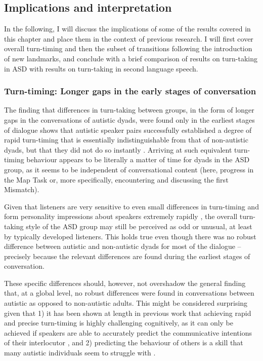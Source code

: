 \subsection{Implications and interpretation}\label{turntaking_conclusion_discussion}

In the following, I will discuss the implications of some of the results covered in this chapter and place them in the context of previous research. I will first cover overall turn-timing and then the subset of transitions following the introduction of new landmarks, and conclude with a brief comparison of results on turn-taking in ASD with results on turn-taking in second language speech.


\subsubsection{Turn-timing: Longer gaps in the early stages of conversation}\label{turntaking_conclusion_discussion_gaps}

The finding that differences in turn-taking between groups, in the form of longer gaps in the conversations of autistic dyads, were found only in the earliest stages of dialogue shows that autistic speaker pairs successfully established a degree of rapid turn-timing that is essentially indistinguishable from that of non-autistic dyads, but that they did not do so instantly \citep[cf.][]{levitanEntrainmentTurnTakingHumanHuman2015}. Arriving at such equivalent turn-timing behaviour appears to be literally a matter of time for dyads in the ASD group, as it seems to be independent of conversational content (here, progress in the Map Task or, more specifically, encountering and discussing the first Mismatch).

Given that listeners are very sensitive to even small differences in turn-timing \citep{kendrickTimingConstructionPreference2015a} and form personality impressions about speakers extremely rapidly \citep{mcaleerHowYouSay2014}, the overall turn-taking style of the ASD group may still be perceived as odd or unusual, at least by typically developed listeners. This holds true even though there was no robust difference between autistic and non-autistic dyads for most of the dialogue -- precisely because the relevant differences are found during the earliest stages of conversation.

These specific differences should, however, not overshadow the general finding that, at a global level, no robust differences were found in conversations between autistic as opposed to non-autistic adults. This might be considered surprising given that 1) it has been shown at length in previous work that achieving rapid and precise turn-timing is highly challenging cognitively, as it can only be achieved if speakers are able to accurately predict the communicative intentions of their interlocutor \citep{bogelsListenersUseIntonational2015,deruiterProjectingEndSpeaker2006,gleitmanGiveTakeEvent2007,wesselingEarlyPreparationExperimentally2005,barthelTimingUtterancePlanning2016}, and 2) predicting the behaviour of others is a skill that many autistic individuals seem to struggle with \citep{cannonPredictionAutismSpectrum2021}.

